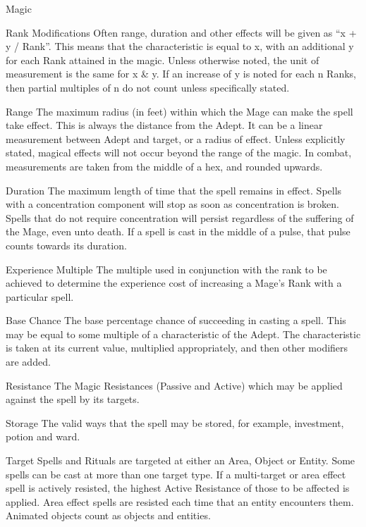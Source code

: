\begin{Chapter}{Magic}
\begin{Description}

\item[Rank Modifications] Often range, duration and other effects will
  be given as “x + y / Rank”. This means that the characteristic is
  equal to x, with an additional y for each Rank attained in the
  magic.  Unless otherwise noted, the unit of measurement is the same
  for x \& y. If an increase of y is noted for each n Ranks, then
  partial multiples of n do not count unless specifically stated.

\item[Range] The maximum radius (in feet) within which the Mage can
  make the spell take effect.  This is always the distance from the
  Adept.  It can be a linear measurement between Adept and target, or
  a radius of effect.  Unless explicitly stated, magical effects will
  not occur beyond the range of the magic.  In combat, measurements
  are taken from the middle of a hex, and rounded upwards.

\item[Duration] The maximum length of time that the spell remains in
  effect. Spells with a concentration component will stop as soon as
  concentration is broken.  Spells that do not require concentration
  will persist regardless of the suffering of the Mage, even unto
  death. If a spell is cast in the middle of a pulse, that pulse
  counts towards its duration.

\item[Experience Multiple] The multiple used in conjunction with the
  rank to be achieved to determine the experience cost of increasing a
  Mage’s Rank with a particular spell.

\item[Base Chance] The base percentage chance of succeeding in casting
  a spell.  This may be equal to some multiple of a characteristic of
  the Adept. The characteristic is taken at its current value,
  multiplied appropriately, and then other modifiers are added.

\item[Resistance] The Magic Resistances (Passive and Active) which may
  be applied against the spell by its targets.

\item[Storage] The valid ways that the spell may be stored, for
  example, investment, potion and ward.

\item[Target] Spells and Rituals are targeted at either an Area,
  Object or Entity.  Some spells can be cast at more than one target
  type. If a multi-target or area effect spell is actively resisted,
  the highest Active Resistance of those to be affected is applied.
  Area effect spells are resisted each time that an entity encounters
  them.  Animated objects count as objects and entities.


\end{Description}
\end{Chapter}
